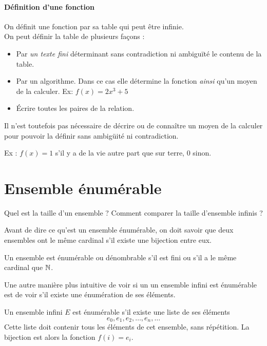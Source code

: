 \paragraph{Définition d'une fonction}
\label{par:d_finition_d_une_fonciton}
On définit une fonction par sa table qui peut être infinie.\\
On peut définir la table de plusieurs façons :
\begin{itemize}
	\item Par \emph{un texte fini} déterminant sans contradiction ni ambiguïté le contenu 
		de la table.
	\item Par un algorithme. Dans ce cas elle détermine la fonction \textit{ainsi} qu'un moyen de la calculer.
		\subitem Ex: $f(x) = 2x^3+5$
	\item Écrire toutes les paires de la relation.
\end{itemize}
Il n'est toutefois pas nécessaire de décrire ou de connaître un moyen de la calculer
pour pouvoir la définir sans ambigüité ni contradiction. 

Ex : $f(x) = 1$ s'il y a de la vie autre part que sur terre, $0$ sinon.

\section{Ensemble énumérable}
\label{sec:ensemble_num_rables}
Quel est la taille d'un ensemble ?  Comment comparer la taille d'ensemble infinis ?

Avant de dire ce qu'est un ensemble énumérable, on doit savoir que deux ensembles
ont le même cardinal s'il existe une bijection entre eux.

\begin{mydef}
	Un ensemble est énumérable ou dénombrable s'il est fini ou s'il a le même cardinal que $\mathbb{N}$. \\
\end{mydef}

Une autre manière plus intuitive de voir si un un ensemble infini est  énumérable est de voir s'il existe une énumération de ses éléments.

\begin{myprop} 
Un ensemble infini $E$ est énumérable s'il existe une liste de ses éléments  
\[
e_0, e_1, e_2, \ldots , e_n, \ldots
\]
Cette liste doit contenir tous les éléments de cet ensemble, sans répétition.  La bijection est alors la fonction $f(i) = e_i$.  
\end{myprop}

